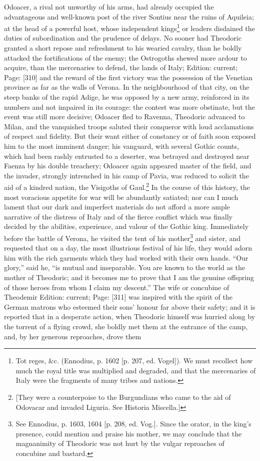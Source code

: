 Odoacer, a rival not unworthy of his arms, had already occupied the advantageous and well-known post of the river Sontius near the ruins of Aquileia; at the head of a powerful host, whose independent kings\footnote{Tot reges, \&c. (Ennodius, p. 1602 [p. 207, ed. Vogel]). We must recollect how much the royal title was multiplied and degraded, and that the mercenaries of Italy were the fragments of many tribes and nations.} or leaders disdained the duties of subordination and the prudence of delays. No sooner had Theodoric granted a short repose and refreshment to his wearied cavalry, than he boldly attacked the fortifications of the enemy; the Ostrogoths shewed more ardour to acquire, than the mercenaries to defend, the lands of Italy; Edition: current; Page: [310] and the reward of the first victory was the possession of the Venetian province as far as the walls of Verona. In the neighbourhood of that city, on the steep banks of the rapid Adige, he was opposed by a new army, reinforced in its numbers and not impaired in its courage: the contest was more obstinate, but the event was still more decisive; Odoacer fled to Ravenna, Theodoric advanced to Milan, and the vanquished troops saluted their conqueror with loud acclamations of respect and fidelity. But their want either of constancy or of faith soon exposed him to the most imminent danger; his vanguard, with several Gothic counts, which had been rashly entrusted to a deserter, was betrayed and destroyed near Faenza by his double treachery; Odoacer again appeared master of the field, and the invader, strongly intrenched in his camp of Pavia, was reduced to solicit the aid of a kindred nation, the Visigoths of Gaul.\footnote{[They were a counterpoise to the Burgundians who came to the aid of Odovacar and invaded Liguria. See Historia Miscella.]} In the course of this history, the most voracious appetite for war will be abundantly satiated; nor can I much lament that our dark and imperfect materials do not afford a more ample narrative of the distress of Italy and of the fierce conflict which was finally decided by the abilities, experience, and valour of the Gothic king. Immediately before the battle of Verona, he visited the tent of his mother\footnote{See Ennodius, p. 1603, 1604 [p. 208, ed. Vog.]. Since the orator, in the king\texthebrew{}’s presence, could mention and praise his mother, we may conclude that the magnanimity of Theodoric was not hurt by the vulgar reproaches of concubine and bastard.} and sister, and requested that on a day, the most illustrious festival of his life, they would adorn him with the rich garments which they had worked with their own hands. \texthebrew{“}Our glory,\texthebrew{}” said he, \texthebrew{“}is mutual and inseparable. You are known to the world as the mother of Theodoric; and it becomes me to prove that I am the genuine offspring of those heroes from whom I claim my descent.\texthebrew{}” The wife or concubine of Theodemir Edition: current; Page: [311] was inspired with the spirit of the German matrons who esteemed their sons\texthebrew{}’ honour far above their safety; and it is reported that in a desperate action, when Theodoric himself was hurried along by the torrent of a flying crowd, she boldly met them at the entrance of the camp, and, by her generous reproaches, drove them 
